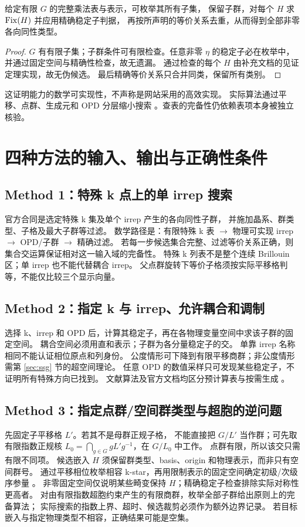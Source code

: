 \begin{theorem}[有限表示下的完整但低效的枚举]
给定有限 $G$ 的完整乘法表与表示，可枚举其所有子集，
保留子群，对每个 $H$ 求 $\operatorname{Fix}(H)$ 并应用精确稳定子判据，
再按所声明的等价关系去重，从而得到全部非零各向同性类型。
\end{theorem}
\begin{proof}
$G$ 有有限子集；子群条件可有限检查。任意非零 $\eta$ 的稳定子必在枚举中，
并通过固定空间与精确性检查，故无遗漏。
通过检查的每个 $H$ 由补充文档的见证定理实现，故无伪候选。
最后精确等价关系只合并同类，保留所有类别。
\end{proof}
这证明能力的数学可实现性，不声称是网站采用的高效实现。
实际算法通过平移、点群、生成元和 OPD 分层缩小搜索
\citep{Stokes2016,Stokes2017}。查表的完备性仍依赖表项本身被独立核验。

\section{四种方法的输入、输出与正确性条件}\label{sec:methods}
\subsection{Method 1：特殊 k 点上的单 irrep 搜索}
官方合同是选定特殊 k 集及单个 irrep 产生的各向同性子群，
并施加晶系、群类型、子格及最大子群等过滤\citep{OfficialHelp}。
数学路径是：有限特殊 k 表 $\to$ 物理可实现 irrep $\to$
OPD/子群 $\to$ 精确过滤。
若每一步候选集合完整、过滤等价关系正确，则集合交运算保证相对这一输入域的完备性。
特殊 k 列表不是整个连续 Brillouin 区；单 irrep 也不能代替耦合 irrep。
父点群旋转下等价子格须按实际平移格判等，不能仅比较三个显示向量。

\subsection{Method 2：指定 k 与 irrep、允许耦合和调制}
选择 k、irrep 和 OPD 后，计算其稳定子，再在各物理变量空间中求该子群的固定空间。
耦合空间必须用直和表示；子群为各分量稳定子的交。
单靠 irrep 名称相同不能认证相位原点和列身份。
公度情形可下降到有限平移商群；非公度情形需第 \ref{sec:ssg} 节的超空间理论。
任意 OPD 的数值采样只可发现某些稳定子，不证明所有特殊方向已找到。
文献算法及官方文档均区分预计算表与按需生成
\citep{Stokes2016,Stokes2017,OfficialHelp}。

\subsection{Method 3：指定点群/空间群类型与超胞的逆问题}
先固定子平移格 $L'$。若其不是母群正规子格，
不能直接把 $G/L'$ 当作群；可先取有限指数正规核
$L_0=\bigcap_{g\in G}gL'g^{-1}$，在 $G/L_0$ 中工作。
点群有限，所以该交只需有限不同项。
候选嵌入 $H$ 须保留群类型、basis、origin 和物理表示，而非只有空间群号。
通过平移相位枚举相容 k-star，再用限制表示的固定空间确定初级/次级序参量
\citep{Hatch2002,COPL2002}。
非零固定空间仅说明某些畸变保持 $H$；精确稳定子检查排除实际对称性更高者。
对由有限指数超胞约束产生的有限商群，枚举全部子群给出原则上的完备算法；
实际搜索的指数上界、超时、候选裁剪必须作为额外边界记录。
若目标嵌入与指定物理类型不相容，正确结果可能是空集。


